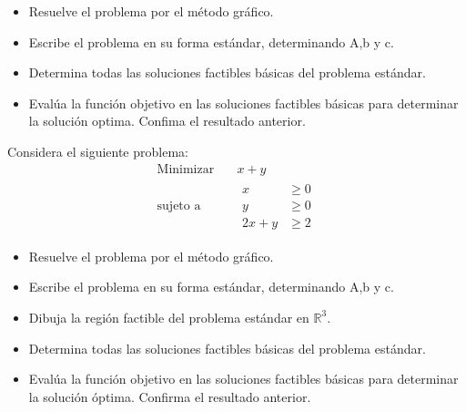 \documentclass{article}
\begin{document}
\begin{itemize}
\item Resuelve el problema por el método gráfico.
\item  Escribe el problema en su forma estándar, determinando A,b y c.
\item Determina todas las soluciones factibles básicas del problema estándar.
  \item Evalúa la función objetivo en las soluciones factibles básicas para determinar la solución optima. Confima el resultado anterior.
  \end{itemize}
Considera el siguiente problema:
\begin{equation*}
  \begin{aligned}
    \text{Minimizar}\quad & x+y \\
    \text{sujeto a}\quad &
    \begin{aligned}
      x & \geq 0\\
      y & \geq 0\\
      2x+y & \geq 2
      \end{aligned}    
   \end{aligned}
 \end{equation*}
 \begin{itemize}
 \item Resuelve el problema por el método gráfico.
 \item Escribe el problema en su forma estándar, determinando A,b y c.
 \item Dibuja la región factible del problema estándar en  $\mathbb{R}^3$.
 \item Determina todas las soluciones factibles básicas del problema estándar.
   \item Evalúa la función objetivo en las soluciones factibles básicas para determinar la solución óptima. Confirma el resultado anterior.
   \end{itemize}
\end{document}
